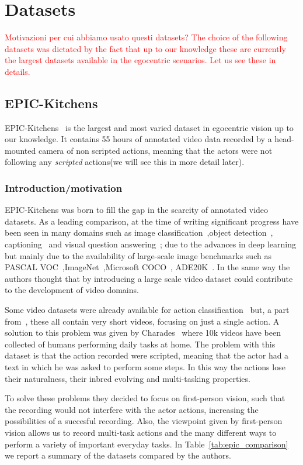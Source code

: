 \chapter{Datasets}
\textcolor{red}{Motivazioni per cui abbiamo usato questi datasets?
The choice of the following datasets was dictated by the fact that up to our knowledge these are 
currently the largest datasets available in the egocentric scenarios. Let us see these in details.}
\section{EPIC-Kitchens}\label{sec:EK}
EPIC-Kitchens~\cite{EPICKITCHENS} is the largest and most varied dataset in egocentric vision up to our knowledge.
It contains 55 hours of annotated video data recorded by a head-mounted camera of non scripted actions, 
meaning that the actors were not following any \textit{scripted} actions(we will see this in more detail
later).
\subsection{Introduction/motivation}
EPIC-Kitchens was born to fill the gap in the scarcity of annotated video datasets.
As a leading comparison, at the time of writing significant progress have been seen in many domains
such as image classification~\cite{residualImage},object detection~\cite{fasterRCNN},
captioning~\cite{captioning} and visual question answering~\cite{vqa}; due to the advances in deep
learning but mainly due to the availability of large-scale image benchmarks 
such as PASCAL VOC~\cite{pascalImage},ImageNet~\cite{imagenet},Microsoft COCO~\cite{COCO},
ADE20K~\cite{ADE20K}. In the same way the authors thought that by introducing
a large scale video dataset could contribute to the development 
of video domains.

Some video datasets were already available for action classification~\cite{somethingSomething,yt,movieBench,movieQA,vlogs}
but, a part from~\cite{movieQA}, these all contain very short videos, focusing on just
a single action. A solution to this problem was given by Charades~\cite{charades} where 10k
videos have been collected of humans performing daily tasks at home.
The problem with this dataset is that the action recorded were scripted,
meaning that the actor had a text in which he was asked to perform some steps.
In this way the actions lose their naturalness, their inbred evolving 
and multi-tasking properties.

To solve these problems they decided to focus on first-person vision, such that
the recording would not interfere with the actor actions, increasing the 
possibilities of a succesful recording. Also, the viewpoint given by 
first-person vision allows us to record multi-task actions and the many different
ways to perform a variety of important everyday tasks. In Table~\ref{tab:epic_comparison}
we report a summary of the datasets compared by the authors.

